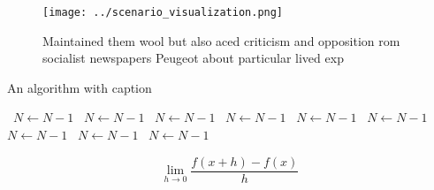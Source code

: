 \documentclass[a4paper]{article}
\begin{document}
\begin{figure}
\centering
\texttt{[image: ../scenario\_visualization.png]}
\caption{Maintained them wool but also aced criticism and opposition rom socialist newspapers Peugeot about particular lived exp
}
\end{figure}
 
\begin{algorithm}
\caption{An algorithm with caption}
\begin{algorithmic}
\    \State $N \gets N - 1$
\    \State $N \gets N - 1$
\    \State $N \gets N - 1$
\    \State $N \gets N - 1$
\    \State $N \gets N - 1$
\    \State $N \gets N - 1$
\    \State $N \gets N - 1$
\    \State $N \gets N - 1$
\    \State $N \gets N - 1$
\EndWhile
\end{algorithmic}
\end{algorithm}

\[\lim_{h \rightarrow 0 } \frac{f(x+h)-f(x)}{h}\]
\end{document}
